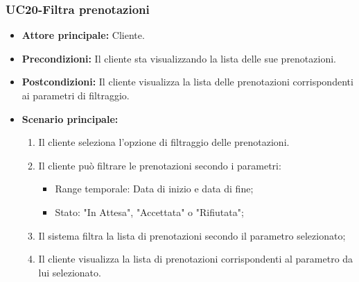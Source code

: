 \subsubsection{UC20-Filtra prenotazioni}
\begin{itemize}
\item \textbf{Attore principale:} Cliente.
\item \textbf{Precondizioni:} Il cliente sta visualizzando la lista delle sue prenotazioni.
\item \textbf{Postcondizioni:} Il cliente visualizza la lista delle prenotazioni corrispondenti ai parametri di filtraggio.
\item \textbf{Scenario principale:}
\begin{enumerate}
    \item Il cliente seleziona l'opzione di filtraggio delle prenotazioni.
    \item Il cliente può filtrare le prenotazioni secondo i parametri:
              \begin{itemize}
                \item Range temporale: Data di inizio e data di fine;
                \item Stato: "In Attesa", "Accettata" o "Rifiutata";
              \end{itemize}
    \item Il sistema filtra la lista di prenotazioni secondo il parametro selezionato;
    \item Il cliente visualizza la lista di prenotazioni corrispondenti al parametro da lui selezionato. 
\end{enumerate}
\end{itemize}

